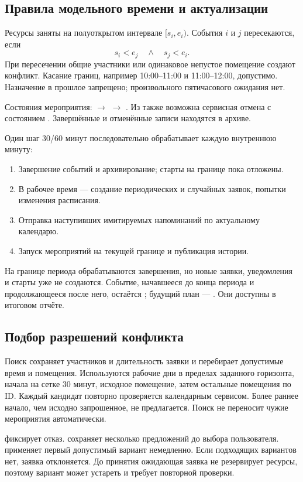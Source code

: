 \subsection{Правила модельного времени и актуализации}
Ресурсы заняты на полуоткрытом интервале $[s_i,e_i)$. События $i$ и $j$ пересекаются, если
\[
 s_i<e_j\quad\land\quad s_j<e_i.
\]
При пересечении общие участники или одинаковое непустое помещение создают конфликт. Касание границ, например 10:00--11:00 и 11:00--12:00, допустимо. Назначение в прошлое запрещено; произвольного пятичасового ожидания нет.

Состояния мероприятия:  $\rightarrow$  $\rightarrow$ . Из  также возможна сервисная отмена с состоянием . Завершённые и отменённые записи находятся в архиве.

Один шаг 30/60 минут последовательно обрабатывает каждую внутреннюю минуту:
\begin{enumerate}
\item Завершение событий и архивирование; старты на границе пока отложены.
\item В рабочее время --- создание периодических и случайных заявок, попытки изменения расписания.
\item Отправка наступивших имитируемых напоминаний по актуальному календарю.
\item Запуск мероприятий на текущей границе и публикация истории.
\end{enumerate}
На границе периода обрабатываются завершения, но новые заявки, уведомления и старты уже не создаются. Событие, начавшееся до конца периода и продолжающееся после него, остаётся ; будущий план --- . Они доступны в итоговом отчёте.

\subsection{Подбор разрешений конфликта}
Поиск сохраняет участников и длительность заявки и перебирает допустимые время и помещения. Используются рабочие дни в пределах заданного горизонта, начала на сетке 30 минут, исходное помещение, затем остальные помещения по ID. Каждый кандидат повторно проверяется календарным сервисом. Более раннее начало, чем исходно запрошенное, не предлагается. Поиск не переносит чужие мероприятия автоматически.

 фиксирует отказ.  сохраняет несколько предложений до выбора пользователя.  применяет первый допустимый вариант немедленно. Если подходящих вариантов нет, заявка отклоняется. До принятия ожидающая заявка не резервирует ресурсы, поэтому вариант может устареть и требует повторной проверки.
